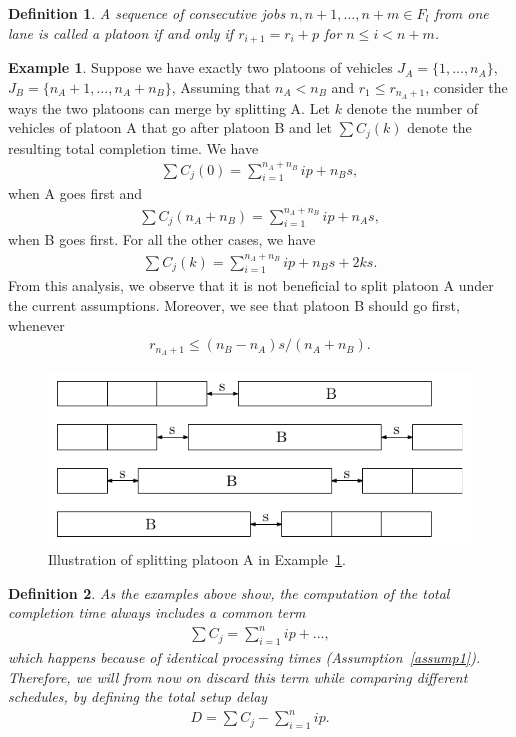\documentclass{article}
\theoremstyle{definition}
\newtheorem{eg}{Example}[section]
\theoremstyle{plain}
\newtheorem{define}{Definition}[section]
\begin{document}
%
\begin{define}
  A sequence of consecutive jobs $n, n+1, \dots, n+m \in F_{l}$ from one lane is called a platoon if and only if $r_{i+1} = r_{i} + p$ for $n \leq i < n + m$.
\end{define}
%
\begin{eg}
  \label{example3}
  Suppose we have exactly two platoons of vehicles
  $J_{A} = \{ 1, \dots, n_{A}\}$, $J_{B} = \{ n_{A} + 1, \dots, n_{A} + n_{B}\}$,
  Assuming that
  $n_{A} < n_{B}$ and $r_{1} \leq r_{n_{A}+1}$, consider the ways the two platoons can merge by splitting A.
  Let $k$ denote the number of vehicles of platoon A that go after platoon B and
  let $\sum C_{j}(k)$ denote the resulting total completion time. We have
  \begin{align*}
    \sum C_{j}(0) = \sum_{i=1}^{n_{A}+n_{B}} ip + n_{B}s ,
  \end{align*}
  when A goes first and
  \begin{align*}
    \sum C_{j}(n_{A}+n_{B}) = \sum_{i=1}^{n_{A}+n_{B}} ip + n_{A}s ,
  \end{align*}
  when B goes first. For all the other cases, we have
  \begin{align*}
    \sum C_{j}(k) = \sum_{i=1}^{n_{A}+n_{B}} ip + n_{B}s + 2ks .
  \end{align*}
  From this analysis, we observe that it is not beneficial to split platoon A under the current assumptions. Moreover, we see that platoon B should go first, whenever
  \begin{align*}
    r_{n_{A} + 1} \leq (n_{B} - n_{A}) s / (n_{A} + n_{B}) .
  \end{align*}
\end{eg}
\begin{figure}
  \centering
  \includegraphics{figures/platoons.pdf}
  \caption{Illustration of splitting platoon A in Example~\ref{example3}.}
  \label{fig:example3}
\end{figure}

\begin{define}
  As the examples above show, the computation of the total completion time always includes a common term
  \begin{align*}
    \sum C_{j} = \sum_{i=1}^{n} ip + \dots ,
  \end{align*}
  which happens because of identical processing times
  (Assumption~\ref{assump1}). Therefore, we will from now on discard this term
  while comparing different schedules, by defining the {\normalfont total setup delay}
  \begin{align*}
    D = \sum C_{j} - \sum_{i=1}^{n} ip .
  \end{align*}
\end{define}
\end{document}
